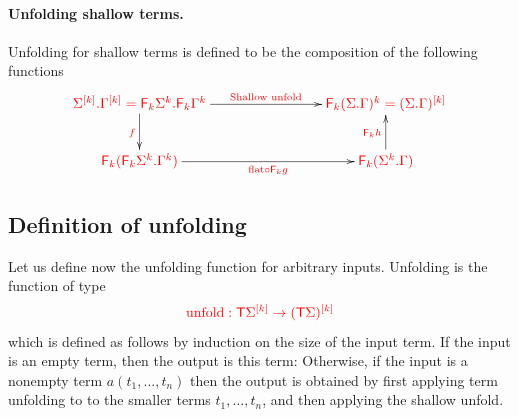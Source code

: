 \paragraph*{Unfolding shallow terms.} Unfolding for shallow terms is defined to be  the composition of the following functions
  \begin{align*}
  \xymatrix@C=2.8cm{
          \ranked{\shallowterm{\mati k \rSigma} {\mati k \rGamma} = {\shallowterm{\reduce k {\Sigma^k}}{\reduce k {\Gamma^k}}} 
        \ar[d]_{\ranked{\substack{f}}}
        \ar[r]^-{\ranked{\text{Shallow unfold}}}}
        &
        \ranked{ \reduce k(\shallowterm{\Sigma}{ {\Gamma}})^k = \mati k {(\shallowterm \Sigma \Gamma)}}
        \\
       \ranked{  \reduce k(\shallowterm{\reduce k {\Sigma^k}}{ {\Gamma^k}})}
        \ar[r]_-{\ranked{\flatt\circ \reduce k g}}
        &
    \ranked{   \reduce k(\shallowterm{\Sigma^k}{ {\Gamma}}) } \ar[u]^{\ranked{\reduce k  h}}
    } 
\end{align*}    

\subsection{Definition of unfolding}
Let us define now  the unfolding function for arbitrary inputs.
Unfolding is the function of type 
\begin{align*}
    \ranked{\unfold : \tmonad \mati k \rSigma \to \mati k {(\tmonad \Sigma)} }
    \end{align*}
    which  is defined as follows by induction on the size of the input term. If the input is an empty term, then the output is this term:
Otherwise, if the input is a nonempty term $a(t_1,\ldots,t_n)$ then the output is obtained by first applying term unfolding to to the smaller terms $t_1,\ldots,t_n$, and then applying the shallow unfold. 